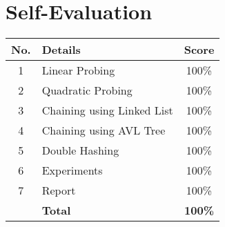 \section{Self-Evaluation}
\begin{center}
	\begin{tabularx}{0.7\textwidth}{|c|X|c|}
		\hline
		\textbf{No.} & \textbf{Details}           & \textbf{Score} \\ \hline
		1            & Linear Probing             & 100\%          \\ \hline
		2            & Quadratic Probing          & 100\%          \\ \hline
		3            & Chaining using Linked List & 100\%          \\ \hline
		4            & Chaining using AVL Tree    & 100\%          \\ \hline
		5            & Double Hashing             & 100\%          \\ \hline
		6            & Experiments                & 100\%          \\ \hline
		7            & Report                     & 100\%          \\ \hline
		             & \textbf{Total}             & \textbf{100\%} \\ \hline
	\end{tabularx}
\end{center}